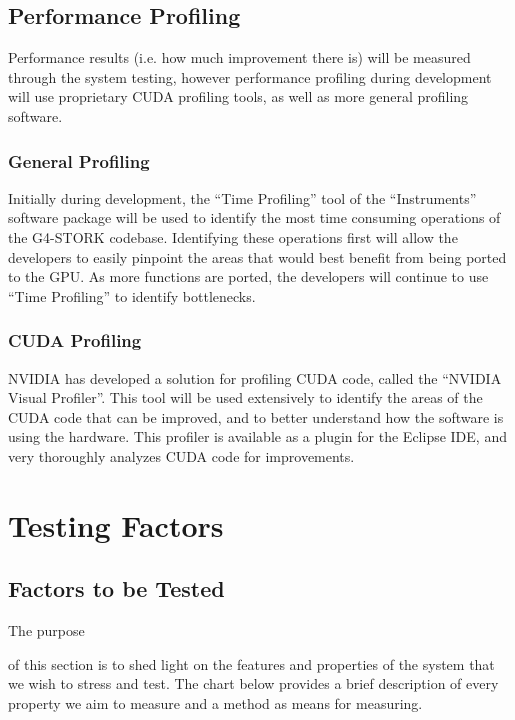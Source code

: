 \documentclass[12pt]{article}
\newcommand{\todo}[1]{\textcolor{red}{[TODO: #1]}} \else
\newcommand{\authornote}[3]{} \newcommand{\todo}[1]{} \fi
\newcommand{\ds}[1]{\authornote{blue}{DS}{#1}}
\newcommand{\mmp}[1]{\authornote{green}{MP}{#1}}
\begin{document}
\subsection{Performance Profiling}
Performance results (i.e. how much improvement there is) will be measured through the system testing, however performance profiling during development will use proprietary CUDA profiling tools, as well as more general profiling software. 

\subsubsection{General Profiling}
Initially during development, the ``Time Profiling'' tool of the ``Instruments'' software package will be used to identify the most time consuming operations of the G4-STORK codebase. Identifying these operations first will allow the developers to easily pinpoint the areas that would best benefit from being ported to the GPU. As more functions are ported, the developers will continue to use ``Time Profiling'' to identify bottlenecks.

\subsubsection{CUDA Profiling}
NVIDIA has developed a solution for profiling CUDA code, called the ``NVIDIA Visual Profiler''. This tool will be used extensively to identify the areas of the CUDA code that can be improved, and to better understand how the software is using the hardware. This profiler is available as a plugin for the Eclipse IDE, and very thoroughly analyzes CUDA code for improvements.

\section{Testing Factors}

\subsection{Factors to be Tested} %
The purpose
\ds{``purpose"}\mmp{fixed spelling mistake}
of this section is to shed light on the features and properties of the system that we wish to stress and test. The chart below provides a brief description of every property we aim to measure and a method as means for measuring.\\
\end{document}
